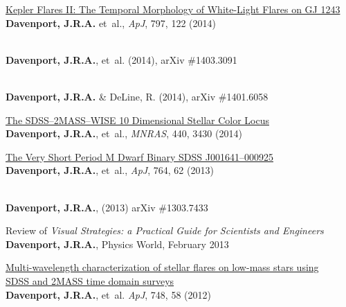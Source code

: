 \documentclass{article}
\begin{document}
\begin{llist}
\begin{etaremune}[leftmargin=10pt]

\item{\sc \href{http://adsabs.harvard.edu/abs/2014ApJ...797..122D}{\color{blue}Kepler Flares II: The Temporal Morphology of White-Light Flares on GJ 1243}}\\
{\bf Davenport, J.R.A.} et~al.,  {\em ApJ}, 797, 122 (2014)

\item\href{http://arxiv.org/abs/1403.3091}{\color{blue}{\sc Studying Gender in Conference Talks -- data from the 223rd meeting of the\\ American Astronomical Society}}\\
{\bf Davenport, J.R.A.}, et~al.  (2014), arXiv \#1403.3091


\item\href{http://arxiv.org/abs/1401.6058}{\color{blue}{\sc The Readability of Tweets and their Geographic Correlation with Education}}\\
{\bf Davenport, J.R.A.} \& DeLine, R. (2014), arXiv \#1401.6058


\item{\sc \href{http://adsabs.harvard.edu/abs/2014MNRAS.440.3430D}{\color{blue}The SDSS--2MASS--WISE 10 Dimensional Stellar Color Locus}}\\
{\bf Davenport, J.R.A.}, et~al., {\em MNRAS}, 440, 3430 (2014)


\item{\sc \href{http://adsabs.harvard.edu/abs/2013ApJ...764...62D}{\color{blue}The Very Short Period M Dwarf Binary SDSS J001641--000925}}\\
{\bf Davenport, J.R.A.}, et~al., {\em ApJ}, 764, 62 (2013)

\item\href{http://arxiv.org/abs/1303.7433}{\color{blue}{\sc Unidentified Moving Objects in Next Generation Time Domain Surveys}}\\
{\bf Davenport, J.R.A.}, (2013) arXiv \#1303.7433

\item\href{http://physicsworld.com/cws/article/print/2013/feb/14/visible-improvements}{\color{blue}{\sc Visible Improvements,}} Review of {\it Visual Strategies: a Practical Guide for Scientists and Engineers} {\bf Davenport, J.R.A.},  Physics World, February 2013


\item{\sc \href{http://adsabs.harvard.edu/abs/2012ApJ...748...58D}{\color{blue}Multi-wavelength characterization of stellar flares on low-mass stars using \\SDSS and 2MASS time domain surveys}}\\
{\bf Davenport, J.R.A.}, et~al. {\em ApJ}, 748, 58 (2012)


\end{etaremune}
\end{llist}
\end{document}
